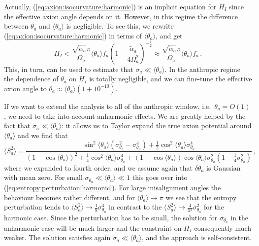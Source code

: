 \documentclass[preprint,nofootinbib]{revtex4}
\begin{document}
Actually, (\ref{eq:axion:isocurvature:harmonic}) is an implicit equation for $H_I$ since the effective axion angle depends on it. However, in this regime the difference between $\theta_a$ and $\langle \theta_a \rangle$ is negligible. To see this, we rewrite (\ref{eq:axion:isocurvature:harmonic}) in terms of $\langle \theta_a \rangle$, and get
\begin{equation}
 H_I < \frac{\sqrt{\tilde{\alpha}_a}\pi}{\Omega_a} \langle \theta_a \rangle f_a \left(1-\frac{\tilde{\alpha}_a}{4\Omega_a^2} \right)^{-\frac{1}{2}} \approx \frac{\sqrt{\tilde{\alpha}_a}\pi}{\Omega_a} \langle \theta_a \rangle f_a\,.
\end{equation}
This, in turn, can be used to estimate that $\sigma_a \ll \langle \theta_a \rangle$. In the anthropic regime the dependence of $\theta_a$ on $H_I$ is totally negligible, and we can fine-tune the effective axion angle to $\theta_a \approx \langle \theta_a \rangle (1+10^{-10})$.

If we want to extend the analysis to all of the anthropic window, i.e.\ $\theta_a=O(1)$, we need to take into account anharmonic effects. We are greatly helped by the fact that $\sigma_a \ll \langle \theta_a \rangle$: it allows us to Taylor expand the true axion potential around $\langle \theta_a \rangle$ and we find that
\begin{equation}
\langle S^2_a \rangle = \frac{\sin^2\langle\theta_a\rangle (\sigma_{\theta_a}^2-\sigma_{\theta_a}^4) + \frac{1}{2} \cos^2\langle\theta_a\rangle \sigma_{\theta_a}^4}{(1-\cos\langle\theta_a\rangle)^2 + \frac{1}{4}\cos^2\langle\theta_a\rangle \sigma_{\theta_a}^4 + (1-\cos\langle\theta_a\rangle)\cos\langle\theta_a\rangle \sigma_{\theta_a}^2(1-\frac{1}{4}\sigma_{\theta_a}^2)}\,,\label{eq:entropy:perturbation:anharmonic}
\end{equation}
where we expanded to fourth order, and we assume again that $\delta \theta_a$ is Gaussian with mean zero. For small $ \sigma_{\theta_a} \ll \langle \theta_a \rangle \ll 1$ this goes over into (\ref{eq:entropy:perturbation:harmonic}). For large misalignment angles the behaviour becomes rather different, and for $\langle \theta_a \rangle \to \pi$ we see that the entropy perturbation tends to $\langle S^2_a \rangle \to \frac{1}{8}\sigma_{\theta_a}^4$ in contrast to the $\langle S^2_a \rangle \to \frac{4}{\pi^2}\sigma_{\theta_a}^2$ for the harmonic case. Since the perturbation has to be small, the solution for $\sigma_{\theta_a}$ in the anharmonic case will be much larger and the constraint on $H_I$ consequently much weaker. The solution satisfies again $\sigma_a \ll \langle \theta_a \rangle$, and the approach is self-consistent.
\end{document}

